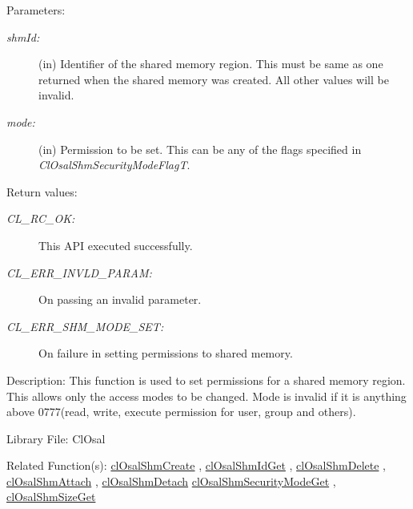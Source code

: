 \begin{Desc}
\item[Parameters:]
\begin{description}
\item[{\em shm\-Id:}](in) Identifier of the shared memory region. This must be same as one returned when the shared memory was created. All other 
values will be invalid.\item[{\em mode:}](in) Permission to be set. This can be any of the flags specified in {\em Cl\-Osal\-Shm\-Security\-Mode\-Flag\-T\/}.\end{description}
\end{Desc}
\begin{Desc}
\item[Return values:]
\begin{description}
\item[{\em CL\_\-RC\_\-OK:}]This API executed successfully. \item[{\em CL\_\-ERR\_\-INVLD\_\-PARAM:}]On passing an invalid parameter. \item[{\em CL\_\-ERR\_\-SHM\_\-MODE\_\-SET:}]On failure in setting permissions to shared memory.\end{description}
\end{Desc}
\begin{Desc}
\item[Description:]This function is used to set permissions for a shared memory region. This allows only the access modes to be changed. Mode is invalid if it is anything above 0777(read, write, execute permission for user, group and others).\end{Desc}
\begin{Desc}
\item[Library File:]Cl\-Osal\end{Desc}
\begin{Desc}
\item[Related Function(s):]\hyperlink{pageosal145}{cl\-Osal\-Shm\-Create} , \hyperlink{pageosal146}{cl\-Osal\-Shm\-Id\-Get} , 
\hyperlink{pageosal147}{cl\-Osal\-Shm\-Delete} , \hyperlink{pageosal148}{cl\-Osal\-Shm\-Attach} , 
\hyperlink{pageosal149}{cl\-Osal\-Shm\-Detach} \hyperlink{pageosal151}{cl\-Osal\-Shm\-Security\-Mode\-Get} , 
\hyperlink{pageosal152}{cl\-Osal\-Shm\-Size\-Get} \end{Desc}

\newpage
